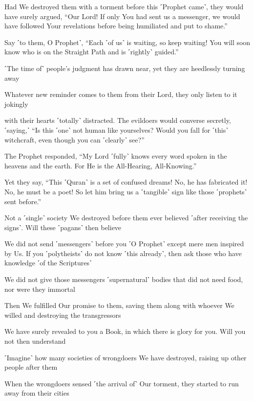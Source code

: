 Had We destroyed them with a torment before this ˹Prophet came˺, they would have surely argued, “Our Lord! If only You had sent us a messenger, we would have followed Your revelations before being humiliated and put to shame.”

Say ˹to them, O Prophet˺, “Each ˹of us˺ is waiting, so keep waiting! You will soon know who is on the Straight Path and is ˹rightly˺ guided.”

˹The time of˺ people’s judgment has drawn near, yet they are heedlessly turning away

Whatever new reminder comes to them from their Lord, they only listen to it jokingly

with their hearts ˹totally˺ distracted. The evildoers would converse secretly, ˹saying,˺ “Is this ˹one˺ not human like yourselves? Would you fall for ˹this˺ witchcraft, even though you can ˹clearly˺ see?”

The Prophet responded, “My Lord ˹fully˺ knows every word spoken in the heavens and the earth. For He is the All-Hearing, All-Knowing.”

Yet they say, “This ˹Quran˺ is a set of confused dreams! No, he has fabricated it! No, he must be a poet! So let him bring us a ˹tangible˺ sign like those ˹prophets˺ sent before.”

Not a ˹single˺ society We destroyed before them ever believed ˹after receiving the signs˺. Will these ˹pagans˺ then believe

We did not send ˹messengers˺ before you ˹O Prophet˺ except mere men inspired by Us. If you ˹polytheists˺ do not know ˹this already˺, then ask those who have knowledge ˹of the Scriptures˺

We did not give those messengers ˹supernatural˺ bodies that did not need food, nor were they immortal

Then We fulfilled Our promise to them, saving them along with whoever We willed and destroying the transgressors

We have surely revealed to you a Book, in which there is glory for you. Will you not then understand

˹Imagine˺ how many societies of wrongdoers We have destroyed, raising up other people after them

When the wrongdoers sensed ˹the arrival of˺ Our torment, they started to run away from their cities

